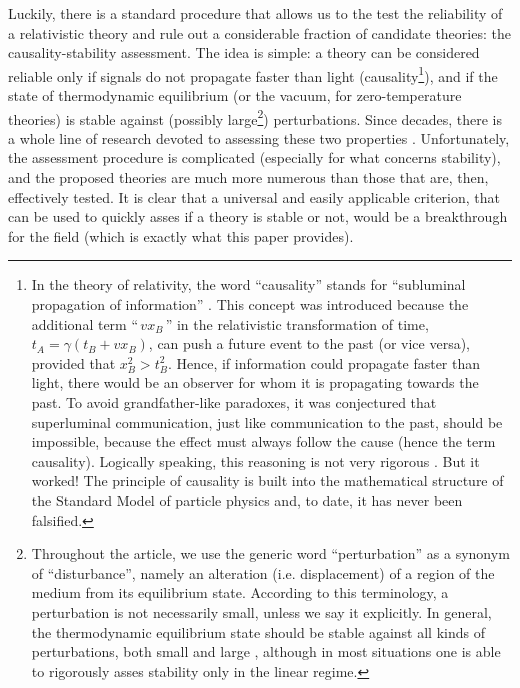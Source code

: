 \documentclass[a4paper, amsfonts, amssymb, amsmath, reprint, showkeys,  twoside, onecolumn,notitlepage,nofootinbib]{revtex4-1}
\theoremstyle{definition}
\theoremstyle{theorem}
\begin{document}
Luckily, there is a standard procedure that allows us to the test the reliability of a relativistic theory and rule out a considerable fraction of candidate theories: the causality-stability assessment. The idea is simple: a theory can be considered reliable only if signals do not propagate faster than light (causality\footnote{{In the theory of relativity, the word ``causality'' stands for ``subluminal propagation of information'' \cite{Hawking1973,Wald,BemficaCausality2018,
Susskind1969,Fox1970}. This concept was introduced because the additional term ``$\, vx_B \,$'' in the relativistic transformation of time, $t_A=\gamma (t_B + v x_B)$,  can push a future event to the past (or vice versa), provided that $x_B^2 > t_B^2$. Hence, if information could propagate faster than light, there would be an observer for whom it is propagating towards the past. To avoid grandfather-like paradoxes, it was conjectured that superluminal communication, just like communication to the past, should be impossible, because the effect must always follow the cause (hence the term causality). Logically speaking, this reasoning is not very rigorous \cite{kessence}. But it worked! The principle of causality is built into the mathematical structure of the Standard Model of particle physics \cite{Peskin_book,Eberhard1988,Keister1996} and, to date, it has never been falsified.}}), and if the state of thermodynamic equilibrium (or the vacuum, for zero-temperature theories) is stable against (possibly large\footnote{Throughout the article, we use the generic word ``perturbation'' as a synonym of ``disturbance'', namely an alteration (i.e. displacement) of a region of the medium from its equilibrium state. According to this terminology, a perturbation is not necessarily small, unless we say it explicitly. In general, the thermodynamic equilibrium state should be stable against all kinds of perturbations, both small and large \cite{Hishcock1988}, although in most situations one is able to rigorously asses stability only in the linear regime.}) perturbations. Since decades, there is a whole line of research devoted to assessing these two properties 
\cite{Stuekelberg1962,
Hishcock1983,OlsonLifsh1990,GerochLindblom1990,
Geroch_Lindblom_1991_causal,Pu2010,
Kovtun2019,Lopez11,Bemfica2019_conformal1,
BrutoThird2021,GavassinoGibbs2021,
GavassinoCausality2021}. Unfortunately, the assessment procedure is complicated (especially for what concerns stability), and the proposed theories are much more numerous than those that are, then, effectively tested. It is clear that a universal and easily applicable criterion, that can be used to quickly asses if a theory is stable or not, would be a breakthrough for the field (which is exactly what this paper provides).   
\end{document}
